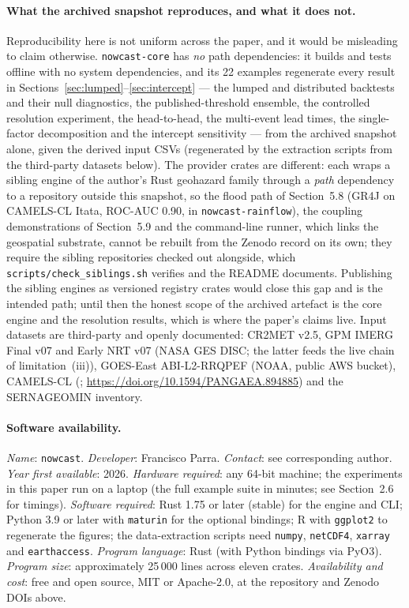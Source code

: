 \documentclass[authoryear,preprint,review,12pt]{elsarticle}
\begin{document}
\paragraph{What the archived snapshot reproduces, and what it does not.}
Reproducibility here is not uniform across the paper, and it would be misleading to
claim otherwise. \texttt{nowcast-core} has \emph{no} path dependencies: it builds
and tests offline with no system dependencies, and its 22 examples regenerate every
result in Sections~\ref{sec:lumped}--\ref{sec:intercept} --- the lumped and
distributed backtests and their null diagnostics, the published-threshold ensemble,
the controlled resolution experiment, the head-to-head, the multi-event lead times,
the single-factor decomposition and the intercept sensitivity --- from the archived
snapshot alone, given the derived input CSVs (regenerated by the extraction scripts
from the third-party datasets below). The provider crates are different: each wraps
a sibling engine of the author's Rust geohazard family through a \emph{path}
dependency to a repository outside this snapshot, so the flood path of
Section~5.8 (GR4J on CAMELS-CL Itata, ROC-AUC 0.90, in
\texttt{nowcast-rainflow}), the coupling demonstrations of Section~5.9 and the
command-line runner, which links the geospatial substrate, cannot be rebuilt from
the Zenodo record on its own; they require the sibling repositories checked out
alongside, which \texttt{scripts/check\_siblings.sh} verifies and the README
documents. Publishing the sibling engines as versioned registry crates would close
this gap and is the intended path; until then the honest scope of the archived
artefact is the core engine and the resolution results, which is where the paper's
claims live. Input datasets are third-party and openly documented: CR2MET v2.5,
GPM IMERG Final v07 and Early NRT v07 (NASA GES DISC; the latter feeds the live
chain of limitation~(iii)), GOES-East ABI-L2-RRQPEF (NOAA, public AWS bucket),
CAMELS-CL
(\citealp{alvarez2018}; \url{https://doi.org/10.1594/PANGAEA.894885}) and the
SERNAGEOMIN inventory.

\paragraph{Software availability.}
\emph{Name}: \texttt{nowcast}.
\emph{Developer}: Francisco Parra.
\emph{Contact}: see corresponding author.
\emph{Year first available}: 2026.
\emph{Hardware required}: any 64-bit machine; the experiments in this paper run on
a laptop (the full example suite in minutes; see Section~2.6 for timings).
\emph{Software required}: Rust 1.75 or later (stable) for the engine and CLI;
Python 3.9 or later with \texttt{maturin} for the optional bindings; R with
\texttt{ggplot2} to regenerate the figures; the data-extraction scripts need
\texttt{numpy}, \texttt{netCDF4}, \texttt{xarray} and \texttt{earthaccess}.
\emph{Program language}: Rust (with Python bindings via PyO3).
\emph{Program size}: approximately 25\,000 lines across eleven crates.
\emph{Availability and cost}: free and open source, MIT or Apache-2.0, at the
repository and Zenodo DOIs above.
\end{document}
